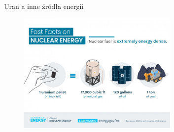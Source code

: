 \begin{frame}{Uran a inne źródła energii}
    \begin{figure}
        \centering
        \includegraphics[width=0.7\textwidth, frame]{images/doe_uranium_propaganda.jpg}
    \end{figure}
\end{frame}

